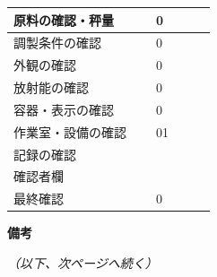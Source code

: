 \documentclass[UTF8,10pt,a4paper,fontset=fandol]{ctexart}
\newcommand{\fieldvalue}[1]{#1}
\newcommand{\handwritten}[1]{#1}
\begin{document}
\begin{center}
\begin{tabular}{|p{0.62\linewidth}|p{0.26\linewidth}|}
\hline
原料の確認・秤量 & 
\fieldvalue{\handwritten{0}}\\
\hline
調製条件の確認 & 
\fieldvalue{\handwritten{0}}\\
\hline
外観の確認 & 
\fieldvalue{\handwritten{0}}\\
\hline
放射能の確認 & 
\fieldvalue{\handwritten{0}}\\
\hline
容器・表示の確認 & 
\fieldvalue{\handwritten{0}}\\
\hline
作業室・設備の確認 & 
\fieldvalue{\handwritten{01}}\\
\hline
記録の確認 & \\
\hline
確認者欄 & \\
\hline
最終確認 & 
\fieldvalue{\handwritten{0}}\\
\hline
\end{tabular}
\end{center}

\noindent
\textbf{備考}\\
\vspace{2em}

\noindent
\textit{（以下、次ページへ続く）}
\end{document}
